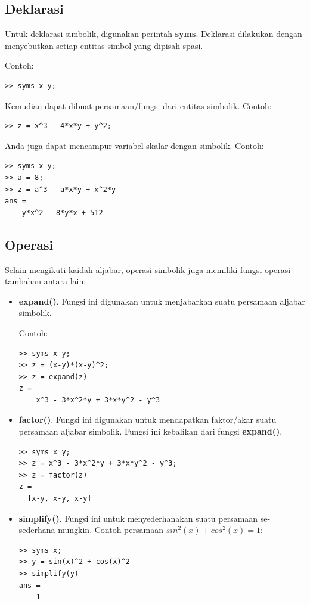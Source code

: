 \documentclass[12pt]{book}
\begin{document}
	\subsection{Deklarasi}
	
	Untuk deklarasi simbolik, digunakan perintah \textbf{syms}.
	Deklarasi dilakukan dengan menyebutkan setiap entitas simbol yang dipisah spasi.
	
	Contoh:
	\begin{verbatim}
>> syms x y;
	\end{verbatim}
	
	Kemudian dapat dibuat persamaan/fungsi dari entitas simbolik.
	Contoh:
 	\begin{verbatim}
>> z = x^3 - 4*x*y + y^2;
 	\end{verbatim}
 
 	Anda juga dapat mencampur variabel skalar dengan simbolik.
 	Contoh:
 	\begin{verbatim}
>> syms x y;
>> a = 8;
>> z = a^3 - a*x*y + x^2*y
ans =
    y*x^2 - 8*y*x + 512
 	\end{verbatim}
	
	\subsection{Operasi}
	
	Selain mengikuti kaidah aljabar, operasi simbolik juga memiliki fungsi operasi tambahan antara lain:
	\begin{itemize}
		\item \textbf{expand()}. Fungsi ini digunakan untuk menjabarkan suatu persamaan aljabar simbolik.
		
		Contoh:
		\begin{verbatim}
>> syms x y;
>> z = (x-y)*(x-y)^2;
>> z = expand(z)
z =
    x^3 - 3*x^2*y + 3*x*y^2 - y^3
		\end{verbatim}
	
		\item \textbf{factor()}. Fungsi ini digunakan untuk mendapatkan faktor/akar suatu persamaan aljabar simbolik.
		Fungsi ini kebalikan dari fungsi \textbf{expand()}.
		\begin{verbatim}
>> syms x y;
>> z = x^3 - 3*x^2*y + 3*x*y^2 - y^3;
>> z = factor(z)
z =
  [x-y, x-y, x-y]
		\end{verbatim}
	
		\item \textbf{simplify()}. Fungsi ini untuk menyederhanakan suatu persamaan se-sederhana mungkin.
		Contoh persamaan $sin^{2}(x) + cos^{2}(x) = 1$:
		\begin{verbatim}
>> syms x;
>> y = sin(x)^2 + cos(x)^2
>> simplify(y)
ans = 
    1
		\end{verbatim}
	\end{itemize}
\end{document}
